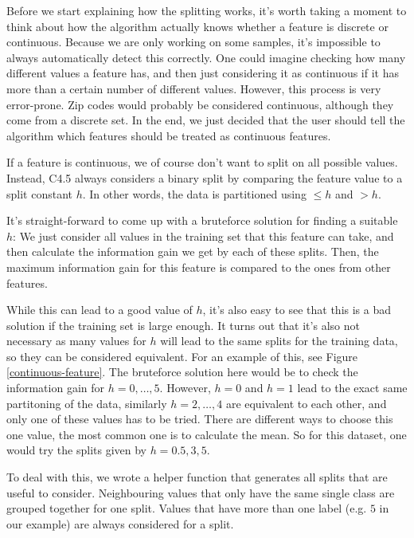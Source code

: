 \documentclass[a4paper]{article}
\begin{document}
Before we start explaining how the splitting works, it's worth taking a moment to think about how the algorithm actually knows whether a feature is discrete or continuous. Because we are only working on some samples, it's impossible to always automatically detect this correctly. One could imagine checking how many different values a feature has, and then just considering it as continuous if it has more than a certain number of different values. However, this process is very error-prone. Zip codes would probably be considered continuous, although they come from a discrete set. In the end, we just decided that the user should tell the algorithm which features should be treated as continuous features.

If a feature is continuous, we of course don't want to split on all possible values. Instead, C4.5 always considers a binary split by comparing the feature value to a split constant $h$. In other words, the data is partitioned using $\le h$ and $> h$.

It's straight-forward to come up with a bruteforce solution for finding a suitable $h$: We just consider all values in the training set that this feature can take, and then calculate the information gain we get by each of these splits. Then, the maximum information gain for this feature is compared to the ones from other features.

While this can lead to a good value of $h$, it's also easy to see that this is a bad solution if the training set is large enough. It turns out that it's also not necessary as many values for $h$ will lead to the same splits for the training data, so they can be considered equivalent. For an example of this, see Figure \ref{continuous-feature}. The bruteforce solution here would be to check the information gain for $h = 0, \dots, 5$. However, $h = 0$ and $h = 1$ lead to the exact same partitoning of the data, similarly $h = 2, \dots, 4$ are equivalent to each other, and only one of these values has to be tried. There are different ways to choose this one value, the most common one is to calculate the mean. So for this dataset, one would try the splits given by $h = 0.5, 3, 5$.

To deal with this, we wrote a helper function that generates all splits that are useful to consider. Neighbouring values that only have the same single class are grouped together for one split. Values that have more than one label (e.g. $5$ in our example) are always considered for a split.
\end{document}
